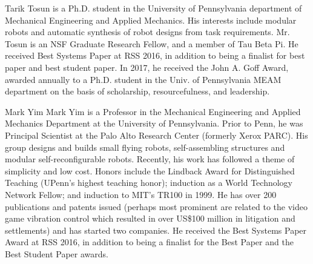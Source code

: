 \documentclass[journal]{IEEEtran}
\begin{document}
\vspace{\biovspace}
%
\begin{IEEEbiography}
{Tarik Tosun} is a Ph.D. student in the University of Pennsylvania department of Mechanical Engineering and Applied Mechanics. His interests include modular robots and automatic synthesis of robot designs from task requirements. Mr. Tosun is an NSF Graduate Research Fellow, and a member of Tau Beta Pi. He received Best Systems Paper at RSS 2016, in addition to being a finalist for best paper and best student paper. In 2017, he received the John A. Goff Award, awarded annually to a Ph.D. student in the Univ. of Pennsylvania MEAM department on the basis of scholarship, resourcefulness, and leadership.
\end{IEEEbiography}
\vspace{\biovspace}
%
\begin{IEEEbiography}
{Mark Yim}
Mark Yim is a Professor in the Mechanical Engineering and Applied Mechanics Department at the University of Pennsylvania. Prior to Penn, he was Principal Scientist at the Palo Alto Research Center (formerly Xerox PARC). His group designs and builds small flying robots, self-assembling structures and modular self-reconfigurable robots. Recently, his work has followed a theme of simplicity and low cost. Honors include the Lindback Award for Distinguished Teaching (UPenn’s highest teaching honor); induction as a World Technology Network Fellow; and induction to MIT’s TR100 in 1999. He has over 200 publications and patents issued (perhaps most prominent are related to the video game vibration control which resulted in over US\$100 million in litigation and settlements) and has started two companies. He received the Best Systems Paper Award at RSS 2016, in addition to being a finalist for the Best Paper and the Best Student Paper awards.
\end{IEEEbiography}
\end{document}
